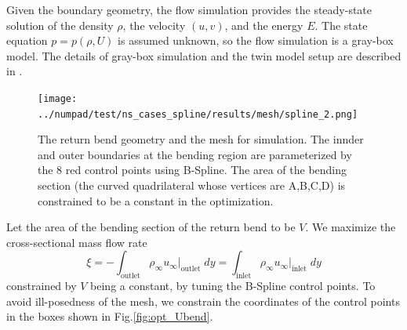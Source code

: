 \documentclass[a4paper,onecolumn]{article}
\theoremstyle{remark}
\begin{document}
Given the boundary geometry, the flow simulation 
provides the steady-state solution of the density $\rho$,
the velocity $(u,v)$, and the energy $E$.
The state equation $p=p(\rho, U)$ is assumed unknown, so the flow simulation is 
a gray-box model.
The details of gray-box simulation and the twin model setup are described in \cite{twin model}.
\begin{figure}[H]\begin{center}
    \texttt{[image: ../numpad/test/ns\_cases\_spline/results/mesh/spline\_2.png]}
    \caption{The return bend geometry and the mesh for simulation. The innder and outer 
    boundaries at the bending region are parameterized by the $8$ red control points using B-Spline.
    The area of the bending section (the curved quadrilateral whose vertices are A,B,C,D) 
    is constrained to be a constant in the optimization.} 
    \label{fig:opt_BL}
\end{center}
\end{figure}

Let the area of the bending section of the return bend to be $V$.
We maximize the cross-sectional mass flow rate 
\begin{equation}
    \xi = - \int_{\textrm{outlet}} \rho_\infty u_\infty \big|_{\textrm{outlet}} \; dy=
    \int_{\textrm{inlet}} \rho_\infty u_\infty\big|_{\textrm{inlet}} \; dy
    \label{mass flux}
\end{equation}
constrained by $V$ being a constant,
by tuning the B-Spline control points. To avoid ill-posedness of the mesh, we
constrain the coordinates of the control points in the boxes shown in Fig.\ref{fig:opt_Ubend}.\\
\end{document}
